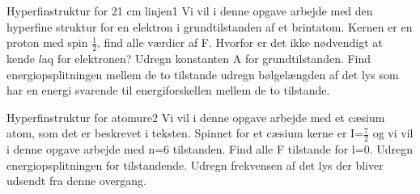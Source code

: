 \documentclass[../../Atom-ogMolekylefysik.tex]{subfiles}
\begin{document}
\begin{opgave}{Hyperfinstruktur for 21 cm linjen}{1}
Vi vil i denne opgave arbejde med den hyperfine struktur for en elektron i grundtilstanden af et brintatom.
\opg Kernen er en proton med spin $\frac{1}{2}$, find alle værdier af F. Hvorfor er det ikke nødvendigt at kende $l$aq for elektronen?
\opg Udregn konstanten A for grundtilstanden.
\opg Find energiopsplitningen mellem de to tilstande
\opg udregn bølgelængden af det lys som har en energi svarende til energiforskellen mellem de to tilstande.
\end{opgave}

\begin{opgave}{Hyperfinstruktur for atomure}{2}
Vi vil i denne opgave arbejde med et cæsium atom, som det er beskrevet i teksten.
Spinnet for et cæsium kerne er I=$\frac{7}{2}$ og vi vil i denne opgave arbejde med n=6 tilstanden.
\opg Find alle F tilstande for l=0.
\opg Udregn energiopsplitningen for tilstandende.
\opg Udregn frekvensen af det lys der bliver udsendt fra denne overgang.
\end{opgave}
\end{document}
